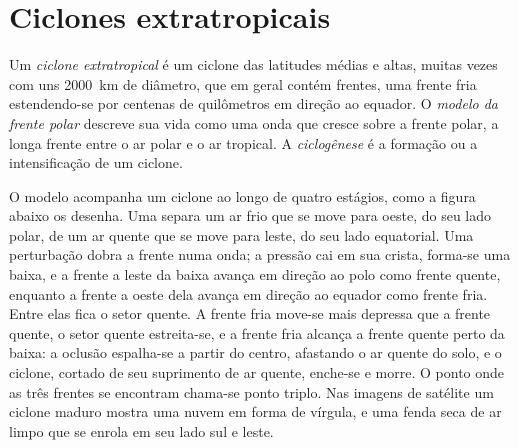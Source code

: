 \section{Ciclones extratropicais}\label{sec:b2:weather-systems:cyclones}

\begin{definition}\label{def:b2:weather-systems:cyclones}
Um \emph{ciclone extratropical} é um ciclone das latitudes médias e
altas, muitas vezes com uns \qty{2000}{km} de diâmetro, que em geral contém frentes, uma frente fria estendendo-se
por centenas de quilômetros em direção ao equador. O \emph{modelo da frente polar}
descreve sua vida como uma onda que cresce sobre a frente polar, a longa frente entre o ar polar
e o ar tropical. A \emph{ciclogênese} é a formação ou a intensificação
de um ciclone.
\end{definition}

O modelo acompanha um ciclone ao longo de quatro estágios, como a figura abaixo os desenha. Uma  separa um ar frio que se move para oeste, do seu lado polar, de um ar quente que se move para leste, do seu lado
equatorial. Uma perturbação dobra a frente numa onda; a pressão cai em sua crista, forma-se uma
baixa, e a frente a leste da baixa avança em direção ao polo como frente quente, enquanto a frente a oeste
dela avança em direção ao equador como frente fria. Entre elas fica o setor quente. A frente fria
move-se mais depressa que a frente quente, o setor quente estreita-se, e a frente fria alcança a frente
quente perto da baixa: a oclusão espalha-se a partir do centro, afastando o ar quente do
solo, e o ciclone, cortado de seu suprimento de ar quente, enche-se e morre. O ponto onde as
três frentes se encontram chama-se ponto triplo. Nas imagens de satélite um ciclone maduro mostra uma
nuvem em forma de vírgula, e uma fenda seca de ar limpo que se enrola em seu lado sul e leste.

